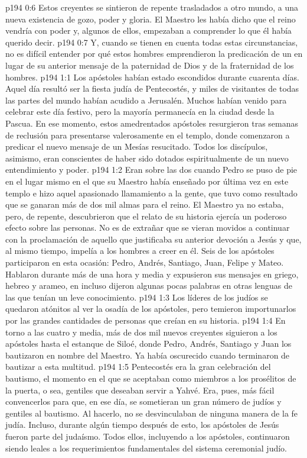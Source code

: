 \vs p194 0:6 Estos creyentes se sintieron de repente trasladados a otro mundo, a una nueva existencia de gozo, poder y gloria. El Maestro les había dicho que el reino vendría con poder y, algunos de ellos, empezaban a comprender lo que él había querido decir.
\vs p194 0:7 Y, cuando se tienen en cuenta todas estas circunstancias, no es difícil entender por qué estos hombres emprendieron la predicación de un  en lugar de su anterior mensaje de la paternidad de Dios y de la fraternidad de los hombres.
\vs p194 1:1 Los apóstoles habían estado escondidos durante cuarenta días. Aquel día resultó ser la fiesta judía de Pentecostés, y miles de visitantes de todas las partes del mundo habían acudido a Jerusalén. Muchos habían venido para celebrar este día festivo, pero la mayoría permanecía en la ciudad desde la Pascua. En ese momento, estos amedrentados apóstoles resurgieron tras semanas de reclusión para presentarse valerosamente en el templo, donde comenzaron a predicar el nuevo mensaje de un Mesías resucitado. Todos los discípulos, asimismo, eran conscientes de haber sido dotados espiritualmente de un nuevo entendimiento y poder.
\vs p194 1:2 Eran sobre las dos cuando Pedro se puso de pie en el lugar mismo en el que su Maestro había enseñado por última vez en este templo e hizo aquel apasionado llamamiento a la gente, que tuvo como resultado que se ganaran más de dos mil almas para el reino. El Maestro ya no estaba, pero, de repente, descubrieron que el relato de su historia ejercía un poderoso efecto sobre las personas. No es de extrañar que se vieran movidos a continuar con la proclamación de aquello que justificaba su anterior devoción a Jesús y que, al mismo tiempo, impelía a los hombres a creer en él. Seis de los apóstoles participaron en esta ocasión: Pedro, Andrés, Santiago, Juan, Felipe y Mateo. Hablaron durante más de una hora y media y expusieron sus mensajes en griego, hebreo y arameo, en incluso dijeron algunas pocas palabras en otras lenguas de las que tenían un leve conocimiento.
\vs p194 1:3 Los líderes de los judíos se quedaron atónitos al ver la osadía de los apóstoles, pero temieron importunarlos por las grandes cantidades de personas que creían en su historia.
\vs p194 1:4 En torno a las cuatro y media, más de dos mil nuevos creyentes siguieron a los apóstoles hasta el estanque de Siloé, donde Pedro, Andrés, Santiago y Juan los bautizaron en nombre del Maestro. Ya había oscurecido cuando terminaron de bautizar a esta multitud.
\vs p194 1:5 Pentecostés era la gran celebración del bautismo, el momento en el que se aceptaban como miembros a los prosélitos de la puerta, o sea, gentiles que deseaban servir a Yahvé. Era, pues, más fácil convencerlos para que, en ese día, se sometieran un gran número de judíos y gentiles al bautismo. Al hacerlo, no se desvinculaban de ninguna manera de la fe judía. Incluso, durante algún tiempo después de esto, los apóstoles de Jesús fueron parte del judaísmo. Todos ellos, incluyendo a los apóstoles, continuaron siendo leales a los requerimientos fundamentales del sistema ceremonial judío.
